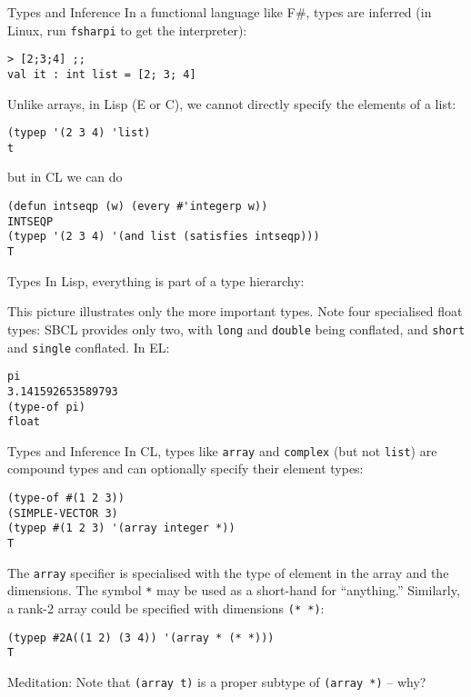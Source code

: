 \documentclass[presentation]{beamer}
\begin{document}
\begin{frame}[fragile]{Types and Inference}
  In a functional language like F\#, types are inferred (in Linux, run \texttt{fsharpi} to get the interpreter):
\begin{verbatim}
> [2;3;4] ;;
val it : int list = [2; 3; 4]
\end{verbatim}

Unlike arrays, in Lisp (E or C), we cannot directly specify the elements of a list:
\begin{verbatim}
(typep '(2 3 4) 'list)
t
\end{verbatim}
but in CL we can do
\begin{verbatim}
(defun intseqp (w) (every #'integerp w))
INTSEQP
(typep '(2 3 4) '(and list (satisfies intseqp)))
T
\end{verbatim}
\end{frame}

\begin{frame}[fragile]{Types}
  In Lisp, everything is part of a type hierarchy:

  This picture illustrates only the more important types.  Note four specialised float types: SBCL provides only two, with \texttt{long} and \texttt{double} being conflated, and \texttt{short} and \texttt{single} conflated.  In EL:
\begin{verbatim}
pi
3.141592653589793
(type-of pi)
float
\end{verbatim}
\end{frame}

\begin{frame}[fragile]{Types and Inference}
  In CL, types like \texttt{array} and \texttt{complex} (but not \texttt{list}) are compound types and can optionally specify their element types:
\begin{verbatim}
(type-of #(1 2 3))
(SIMPLE-VECTOR 3)
(typep #(1 2 3) '(array integer *))
T
\end{verbatim}
The \texttt{array} specifier is specialised with the type of element in the array and the dimensions.  The symbol \texttt{*} may be used as a short-hand for ``anything.''  Similarly, a rank-2 array could be specified with dimensions \texttt{(* *)}:
\begin{verbatim}
(typep #2A((1 2) (3 4)) '(array * (* *)))
T
\end{verbatim}

\medskip
Meditation: Note that \texttt{(array t)} is a proper subtype of \texttt{(array *)} -- why?

\end{frame}
\end{document}
